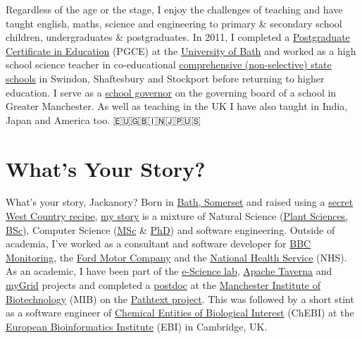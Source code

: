 \documentclass[
  12pt,
]{book}
\begin{document}
Regardless of the age or the stage, I enjoy the challenges of teaching and have taught english, maths, science and engineering to primary \& secondary school children, undergraduates \& postgraduates. In 2011, I completed a \href{https://en.wikipedia.org/wiki/Postgraduate_Certificate_in_Education}{Postgraduate Certificate in Education} (PGCE) at the \href{https://www.bath.ac.uk/}{University of Bath} and worked as a high school science teacher in co-educational \href{https://www.gov.uk/types-of-school}{comprehensive (non-selective) state schools} in Swindon, Shaftesbury and Stockport before returning to higher education. I serve as a \href{https://www.manchester.ac.uk/connect/teachers/school-governors/}{school governor} on the governing board of a school in Greater Manchester. As well as teaching in the UK I have also taught in India, Japan and America too. 🇪🇺🇬🇧🇮🇳🇯🇵🇺🇸

\hypertarget{whats-your-story}{%
\section*{What's Your Story?}\label{whats-your-story}}

What's your story, Jackanory? Born in \href{https://en.wikipedia.org/wiki/Bath,_Somerset}{Bath, Somerset} and raised using a \href{https://en.wikipedia.org/wiki/West_Country}{secret West Country recipe}, \href{https://uk.linkedin.com/in/duncanhull}{my story} is a mixture of Natural Science (\href{https://speakerdeck.com/dullhunk/why-study-plants}{Plant Sciences, BSc}), Computer Science (\href{mastersofscience.html}{MSc} \& \href{https://www.librarysearch.manchester.ac.uk/permalink/44MAN_INST/1r887gn/alma992976677936301631}{PhD}) and software engineering. Outside of academia, I've worked as a consultant and software developer for \href{https://en.wikipedia.org/wiki/BBC_Monitoring}{BBC Monitoring}, the \href{https://en.wikipedia.org/wiki/Ford_Motor_Company}{Ford Motor Company} and the \href{https://en.wikipedia.org/wiki/National_Health_Service}{National Health Service} (NHS). As an academic, I have been part of the \href{https://esciencelab.org.uk/}{e-Science lab}, \href{https://en.wikipedia.org/wiki/Apache_Taverna}{Apache Taverna} and \href{https://en.wikipedia.org/wiki/MyGrid}{myGrid} projects and completed a \href{https://en.wikipedia.org/wiki/Postdoctoral_researcher}{postdoc} at the \href{https://www.mib.manchester.ac.uk/}{Manchester Institute of Biotechnology} (MIB) on the \href{https://pubmed.ncbi.nlm.nih.gov/20529930/}{Pathtext project}. This was followed by a short stint as a software engineer of \href{https://en.wikipedia.org/wiki/ChEBI}{Chemical Entities of Biological Interest} (ChEBI) at the \href{https://en.wikipedia.org/wiki/European_Bioinformatics_Institute}{European Bioinformatics Institute} (EBI) in Cambridge, UK. 🧬👨‍🔬
\end{document}
